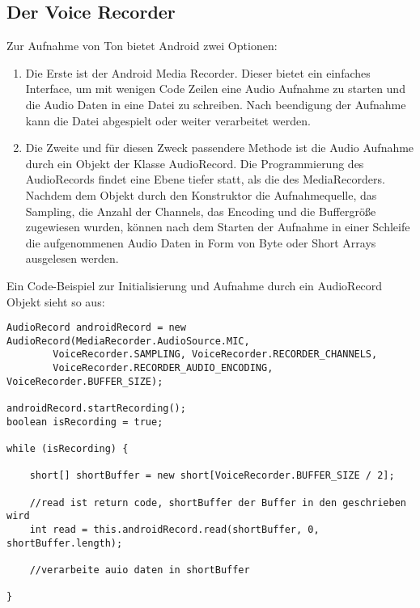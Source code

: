 \subsection{Der Voice Recorder}
Zur Aufnahme von Ton bietet Android zwei Optionen\cite{Recording Optionen}:
\begin{enumerate}
	\item Die Erste ist der Android Media Recorder. Dieser bietet ein einfaches Interface, um mit wenigen Code Zeilen eine Audio Aufnahme zu starten und die Audio Daten in eine Datei zu schreiben. Nach beendigung der Aufnahme kann die Datei abgespielt oder weiter verarbeitet werden.
	\item Die Zweite und für diesen Zweck passendere Methode ist die Audio Aufnahme durch ein Objekt der Klasse AudioRecord. Die Programmierung des AudioRecords findet eine Ebene tiefer statt, als die des MediaRecorders. Nachdem dem Objekt durch den Konstruktor die Aufnahmequelle, das Sampling, die Anzahl der Channels, das Encoding und die Buffergröße zugewiesen wurden, können nach dem Starten der Aufnahme in einer Schleife die aufgenommenen Audio Daten in Form von Byte oder Short Arrays ausgelesen werden.
\end{enumerate}
Ein Code-Beispiel zur Initialisierung und Aufnahme durch ein AudioRecord Objekt sieht so aus:
\begin{lstlisting}
AudioRecord androidRecord = new AudioRecord(MediaRecorder.AudioSource.MIC,
		VoiceRecorder.SAMPLING, VoiceRecorder.RECORDER_CHANNELS,
		VoiceRecorder.RECORDER_AUDIO_ENCODING, VoiceRecorder.BUFFER_SIZE);
		
androidRecord.startRecording();
boolean isRecording = true;

while (isRecording) {

	short[] shortBuffer = new short[VoiceRecorder.BUFFER_SIZE / 2];
	
	//read ist return code, shortBuffer der Buffer in den geschrieben wird
	int read = this.androidRecord.read(shortBuffer, 0, shortBuffer.length);
	
	//verarbeite auio daten in shortBuffer
	
}
\end{lstlisting}

